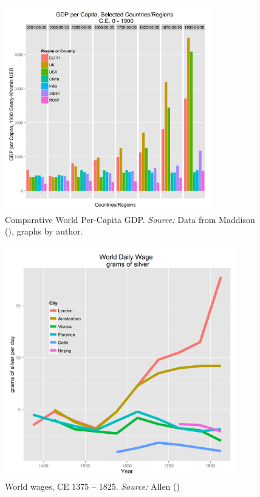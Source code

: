 \documentclass[12pt]{article}
\numberwithin{equation}{section}
\begin{document}
		\begin{figure}[]
		\centering
		\includegraphics[width=0.8\textwidth]{ggdpcapitadodge.png}
		\caption{Comparative World Per-Capita GDP. \textit{Source:} Data from Maddison (\citeyear{maddison_maddison_2010}), graphs by author.}
		\label{fig:capita}
		\end{figure}
		
		\begin{figure}[htb]
		\centering
		\includegraphics[width=0.9\textwidth]{gworldwages.png} 
		\caption{World wages, CE 1375 -- 1825. \textit{Source:} Allen (\citeyear{allen_british_2009}) \label{fig:allen_wages}}

		\end{figure}
		
\end{document}
